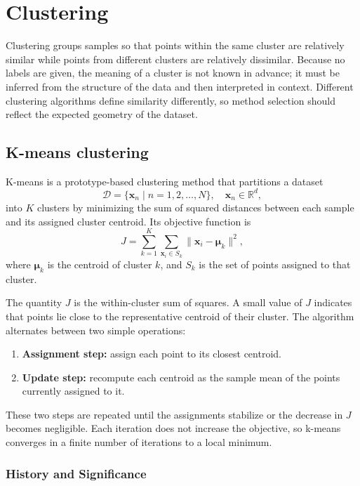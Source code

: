 \documentclass[12pt]{article}
\begin{document}
\section{Clustering}
Clustering groups samples so that points within the same cluster are relatively similar while points from different clusters are relatively dissimilar. Because no labels are given, the meaning of a cluster is not known in advance; it must be inferred from the structure of the data and then interpreted in context. Different clustering algorithms define similarity differently, so method selection should reflect the expected geometry of the dataset.

\subsection{K-means clustering}

K-means is a prototype-based clustering method that partitions a dataset 
\[
\mathcal{D} = \{ \bm{x}_n \mid n=1,2,\ldots,N\}, \quad \bm{x}_n \in \mathbb{R}^d,
\]
into $K$ clusters by minimizing the sum of squared distances between each sample and its assigned cluster centroid. Its objective function is
\begin{equation}
J = \sum_{k=1}^{K} \sum_{\bm{x}_i \in S_k} \lVert \bm{x}_i - \bm{\mu}_k \rVert^2,
\end{equation}
where $\bm{\mu}_k$ is the centroid of cluster $k$, and $S_k$ is the set of points assigned to that cluster. 

The quantity $J$ is the within-cluster sum of squares. A small value of $J$ indicates that points lie close to the representative centroid of their cluster. The algorithm alternates between two simple operations:
\begin{enumerate}
    \item \textbf{Assignment step:} assign each point to its closest centroid.
    \item \textbf{Update step:} recompute each centroid as the sample mean of the points currently assigned to it.
\end{enumerate}
These two steps are repeated until the assignments stabilize or the decrease in $J$ becomes negligible. Each iteration does not increase the objective, so k-means converges in a finite number of iterations to a local minimum.

\subsubsection{History and Significance}
\end{document}
